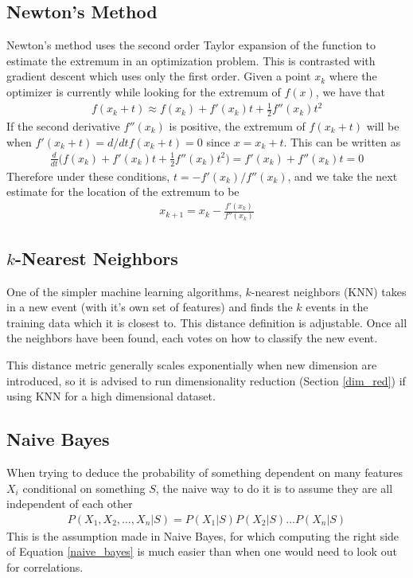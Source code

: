 \subsection{Newton's Method}
Newton's method uses the second order Taylor expansion of the function to estimate the extremum in an optimization problem. This is contrasted with gradient descent which uses only the first order. Given a point $x_k$ where the optimizer is currently while looking for the extremum of $f(x)$, we have that
\begin{align}
	f(x_k+t)\approx f(x_k) + f'(x_k)t + \frac{1}{2}f''(x_k)t^2
\end{align}
If the second derivative $f''(x_k)$ is positive, the extremum of $f(x_k+t)$ will be when $f'(x_k+t) = d/dt f(x_k+t) = 0$ since $x=x_k+t$. This can be written as 
\begin{align}
	\frac{d}{dt}\Big( f(x_k) + f'(x_k)t + \frac{1}{2}f''(x_k)t^2\Big) = f'(x_k)+f''(x_k)t = 0 
\end{align}
Therefore under these conditions, $t = -f'(x_k)/f''(x_k)$, and we take the next estimate for the location of the extremum to be
\begin{align}
	x_{k+1} = x_k-\frac{f'(x_k)}{f''(x_k)}
\end{align} 


\subsection{$k$-Nearest Neighbors}\label{sub:knn}
One of the simpler machine learning algorithms, $k$-nearest neighbors (KNN) takes in a new event (with it's own set of features) and finds the  $k$ events in the training data which it is closest to. This distance definition is adjustable. Once all the neighbors have been found, each votes on how to classify the new event.

This distance metric generally scales exponentially when new dimension are introduced, so it is advised to run dimensionality reduction (Section \ref{dim_red}) if using KNN for a high dimensional dataset.
\subsection{Naive Bayes}
When trying to deduce the probability of something dependent on many features $X_i$ conditional on something $S$, the naive way to do it is to assume they are all independent of each other
\begin{align}\label{naive_bayes}
	P(X_1,X_2,\dots,X_n|S) = P(X_1|S)P(X_2|S)\dots P(X_n|S)
\end{align}
This is the assumption made in Naive Bayes, for which computing the right side of Equation \ref{naive_bayes} is much easier than when one would need to look out for correlations.


